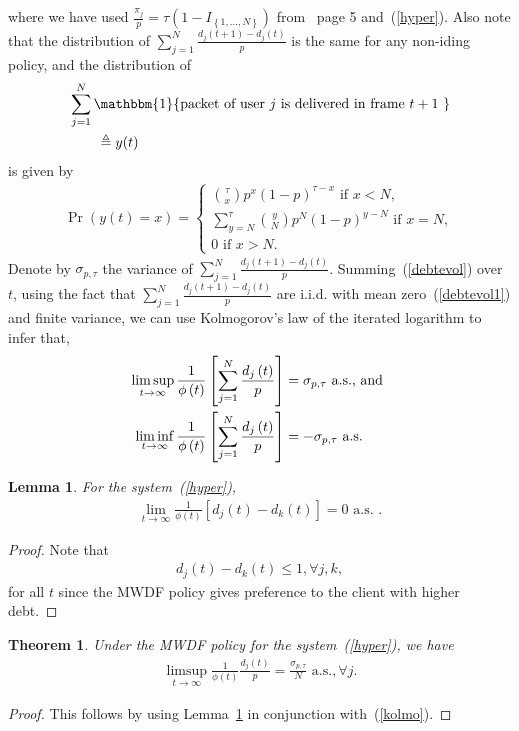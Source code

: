\documentclass[letterpaper, 10 pt, conference]{ieeeconf}
\newtheorem{lemma}{Lemma}
\newtheorem{theorem}{Theorem}
\begin{document}
where we have used  $\frac{\pi_{j}}{p} =  \tau\left(1-I_{\left\{1,\ldots,N\right\}}\right)$ from~\cite{c3} page 5 and~(\ref{hyper}). Also note that the distribution of $\sum_{j=1}^{N} \frac{d_{j}\left(t+1\right) - d_{j}\left(t\right)}{p}$ is the same for any non-iding policy, and the distribution of \\
\begin{align*}
&\sum_{j=1}^{N}\mathbbm{1}\{\mbox{packet of user $j$ is delivered in frame $t+1$ } \}\\
&\qquad \triangleq y(t) 
\end{align*}
is given by
\begin{align*}
\Pr\left(y(t) = x\right) = \begin{cases}
{\tau \choose x}p^{x} \left(1-p\right)^{\tau-x} \mbox{ if $x < N$},\\
{ \sum_{y=N}^{\tau}{y \choose N}p^{N} \left(1-p\right)^{y-N} \mbox{ if $x = N$}},\\
{0	\mbox{ if $x > N$}}.
\end{cases}
\end{align*}
Denote by $\sigma_{p,\tau}$ the variance of $\sum_{j=1}^{N} \frac{d_{j}\left(t+1\right) - d_{j}\left(t\right)}{p}$. Summing~(\ref{debtevol}) over $t$, using the fact that $\sum_{j=1}^{N} \frac{d_{j}\left(t+1\right) - d_{j}\left(t\right)}{p}$ are i.i.d. with mean zero~(\ref{debtevol1}) and finite variance, we can use Kolmogorov's law of the iterated logarithm to infer that,
\begin{align}\label{kolmo}
\limsup_{t\to\infty} \frac{1}{\phi\left(t\right)}\left[\sum_{j=1}^{N} \frac{d_{j}\left(t\right)}{p} \right] &= \sigma_{p,\tau} \mbox{ a.s., and }\notag\\
\liminf_{t\to\infty} \frac{1}{\phi\left(t\right)}\left[\sum_{j=1}^{N} \frac{d_{j}\left(t\right)}{p} \right] &= -\sigma_{p,\tau} \mbox{ a.s.}
\end{align}
\begin{lemma}\label{ssc}
For the system~(\ref{hyper}), 
\begin{align}
\lim_{t\to\infty}\frac{1}{\phi\left(t\right)}\left[d_{j}(t)-d_{k}(t)\right] = 0 \mbox{ a.s. }.
\end{align} 
\end{lemma}
\begin{proof}
Note that 
\begin{align*}
d_{j}(t)-d_{k}(t) \leq 1 ,\forall j,k,
\end{align*}
for all $t$ since the MWDF policy gives preference to the client with higher debt.
\end{proof}
\begin{theorem}\label{theoremnotopt}
Under the MWDF policy for the system~(\ref{hyper}), we have
\begin{align}\label{hyperres}
\limsup_{t\to\infty} \frac{1}{\phi\left(t\right)}\frac{d_{j}\left(t\right)}{p} = \frac{\sigma_{p,\tau}}{N} \mbox{ a.s.} ,\forall j.
\end{align}
\end{theorem}
\begin{proof}
This follows by using Lemma~\ref{ssc} in conjunction with~(\ref{kolmo}).  
\end{proof}
\end{document}
